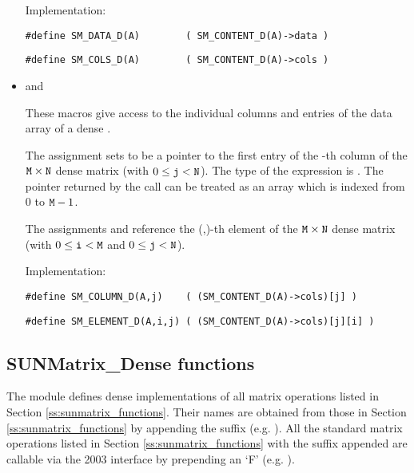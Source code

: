 \begin{itemize}
  Implementation:

  \verb|#define SM_DATA_D(A)        ( SM_CONTENT_D(A)->data )|

  \verb|#define SM_COLS_D(A)        ( SM_CONTENT_D(A)->cols )|


\item {} and 

  These macros give access to the individual columns and entries of
  the data array of a dense .

  The assignment  sets  to be
  a pointer to the first entry of the -th column of the ${\tt M} \times {\tt N}$
  dense matrix  (with $0 \le {\tt j} < {\tt N}$).  The type of the
  expression  is .  The pointer
  returned by the call  can be treated as
  an array which is indexed from $0$ to ${\tt M}-1$.

  The assignments  and  reference the (,)-th element of the
  ${\tt M} \times {\tt N}$ dense matrix  (with $0 \le {\tt i} < {\tt M}$ and
  $0 \le {\tt j} < {\tt N}$).

  Implementation:

  \verb|#define SM_COLUMN_D(A,j)    ( (SM_CONTENT_D(A)->cols)[j] )|

  \verb|#define SM_ELEMENT_D(A,i,j) ( (SM_CONTENT_D(A)->cols)[j][i] )|

\end{itemize}


\subsection{SUNMatrix\_Dense functions}
\label{ss:sunmat_dense_functions}

The {\sunmatdense} module defines dense implementations of all matrix
operations listed in Section \ref{ss:sunmatrix_functions}. Their names are obtained
from those in Section \ref{ss:sunmatrix_functions} by appending the
suffix  (e.g. ).
All the standard matrix operations listed in Section \ref{ss:sunmatrix_functions} with the suffix
 appended are callable via the {\F} 2003 interface by prepending an
`F' (e.g. ).

